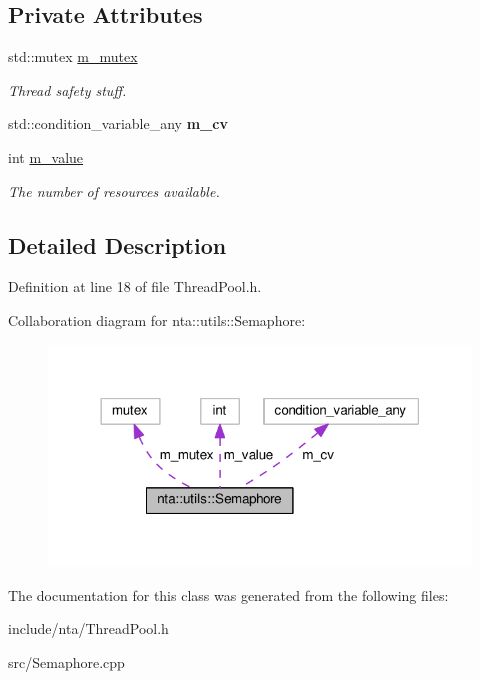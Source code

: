 \subsection*{Private Attributes}
\begin{DoxyCompactItemize}
\item 
\mbox{\label{classnta_1_1utils_1_1Semaphore_a5d349e7ced70eb07eea6b9cfa50a6637}} 
std\+::mutex \hyperlink{classnta_1_1utils_1_1Semaphore_a5d349e7ced70eb07eea6b9cfa50a6637}{m\+\_\+mutex}
\begin{DoxyCompactList}\small\item\em Thread safety stuff. \end{DoxyCompactList}\item 
\mbox{\label{classnta_1_1utils_1_1Semaphore_a30bfcf40c58c71847933806aeab36b30}} 
std\+::condition\+\_\+variable\+\_\+any {\bfseries m\+\_\+cv}
\item 
\mbox{\label{classnta_1_1utils_1_1Semaphore_a7b21b47d4cfecfeeb97758916e23c9bc}} 
int \hyperlink{classnta_1_1utils_1_1Semaphore_a7b21b47d4cfecfeeb97758916e23c9bc}{m\+\_\+value}
\begin{DoxyCompactList}\small\item\em The number of resources available. \end{DoxyCompactList}\end{DoxyCompactItemize}


\subsection{Detailed Description}


Definition at line 18 of file Thread\+Pool.\+h.



Collaboration diagram for nta\+:\+:utils\+:\+:Semaphore\+:\nopagebreak
\begin{figure}[H]
\begin{center}
\leavevmode
\includegraphics[width=318pt]{da/d79/classnta_1_1utils_1_1Semaphore__coll__graph}
\end{center}
\end{figure}


The documentation for this class was generated from the following files\+:\begin{DoxyCompactItemize}
\item 
include/nta/Thread\+Pool.\+h\item 
src/Semaphore.\+cpp\end{DoxyCompactItemize}
